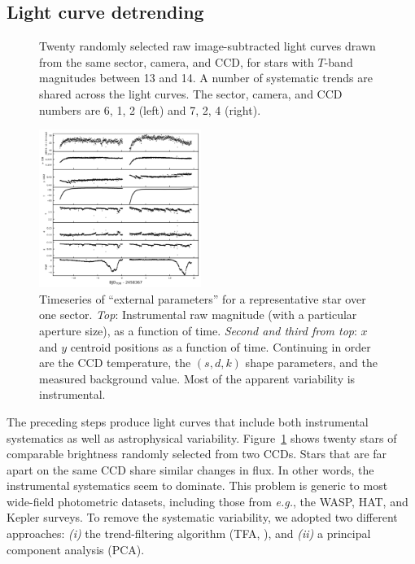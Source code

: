 \documentclass[12pt,twocolumn,tighten]{aastex62}
\begin{document}
\subsection{Light curve detrending}
\label{subsec:lcdetrending}

\begin{figure}[!t]
	\vspace{-0.5cm}
	\caption{
	Twenty randomly selected raw image-subtracted light curves drawn
	from the same sector, camera,
	and CCD, for stars with $T$-band magnitudes between 13 and 14.
	A number of systematic trends are shared across the light curves.
	The sector, camera, and CCD numbers are 6, 1, 2 (left) and 7, 2, 4 (right).
	\label{fig:lc_systematics}
	}
\end{figure}

\begin{figure}[!t]
	\begin{center}
		\leavevmode
		\includegraphics[width=0.47\textwidth]{epdparams_vs_time.png}
	\end{center}
	\vspace{-0.5cm}
	\caption{
		Timeseries of ``external parameters'' for a representative
			star over one sector.
			{\it Top}: Instrumental raw magnitude (with a particular
		aperture size), as a function of time.  {\it Second and third from
			top}: $x$ and $y$ centroid positions as a function of time.
		Continuing in order are the CCD temperature, the $(s,d,k)$ shape
		parameters, and the measured background value.
		Most of the apparent variability is instrumental.
		\label{fig:external_parameter_timeseries}
	}
\end{figure}

The preceding steps produce light curves that include both
instrumental systematics as well as astrophysical variability.
Figure~\ref{fig:lc_systematics} shows twenty stars of
comparable brightness randomly selected from two CCDs.  Stars that are
far apart on the same CCD share similar changes in flux.
In other words, the instrumental systematics seem to dominate.
This problem is generic to most wide-field photometric datasets, including
those from {\it e.g.}, the WASP, HAT, and Kepler surveys.
To remove the systematic variability, we adopted two different
approaches: {\it (i)} the trend-filtering algorithm (TFA,
\citealt{kovacs_trend_2005}), and {\it (ii)} a principal component analysis
(PCA).
\end{document}
